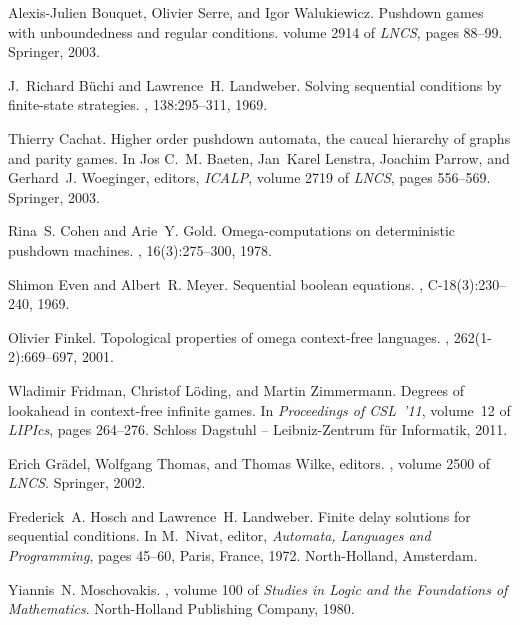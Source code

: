 \documentclass[fleqn,envcountsame]{LMCS}
\begin{document}
\begin{thebibliography}{10}

Alexis-Julien Bouquet, Olivier Serre, and Igor Walukiewicz.
\newblock Pushdown games with unboundedness and regular conditions.
\newblock volume 2914 of {\em LNCS}, pages 88--99. Springer, 2003.

J.~Richard B{\"u}chi and Lawrence~H. Landweber.
\newblock Solving sequential conditions by finite-state strategies.
, 138:295--311, 1969.

Thierry Cachat.
\newblock Higher order pushdown automata, the caucal hierarchy of graphs and
  parity games.
\newblock In Jos C.~M. Baeten, Jan~Karel Lenstra, Joachim Parrow, and
  Gerhard~J. Woeginger, editors, {\em ICALP}, volume 2719 of {\em LNCS}, pages
  556--569. Springer, 2003.

Rina~S. Cohen and Arie~Y. Gold.
\newblock Omega-computations on deterministic pushdown machines.
, 16(3):275--300, 1978.

Shimon Even and Albert~R. Meyer.
\newblock Sequential boolean equations.
, C-18(3):230--240, 1969.

Olivier Finkel.
\newblock Topological properties of omega context-free languages.
, 262(1-2):669--697, 2001.

Wladimir Fridman, Christof L{\"o}ding, and Martin Zimmermann.
\newblock Degrees of lookahead in context-free infinite games.
\newblock In {\em Proceedings of CSL~'11}, volume~12 of {\em LIPIcs}, pages
  264--276. Schloss Dagstuhl -- Leibniz-Zentrum f{\"u}r Informatik, 2011.

Erich Gr{\"a}del, Wolfgang Thomas, and Thomas Wilke, editors.
, volume 2500 of {\em LNCS}.
\newblock Springer, 2002.

Frederick~A. Hosch and Lawrence~H. Landweber.
\newblock Finite delay solutions for sequential conditions.
\newblock In M.~Nivat, editor, {\em Automata, Languages and Programming}, pages
  45--60, Paris, France, 1972. North-Holland, Amsterdam.

Yiannis~N. Moschovakis.
, volume 100 of {\em Studies in Logic and
  the Foundations of Mathematics}.
\newblock North-Holland Publishing Company, 1980.


\end{thebibliography}
\end{document}
